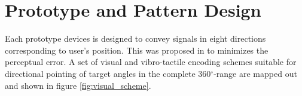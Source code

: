 \documentclass{sigchi}
\begin{document}



\section{Prototype and Pattern Design}

Each prototype devices is designed to convey signals in eight directions corresponding to user's position. This was proposed in \cite{Tessendorf2011} to minimizes the perceptual error. A set of visual and vibro-tactile encoding schemes suitable for directional pointing of target angles in the complete 360$^\circ$-range are mapped out and shown in figure \ref{fig:visual_scheme}.
\end{document}
